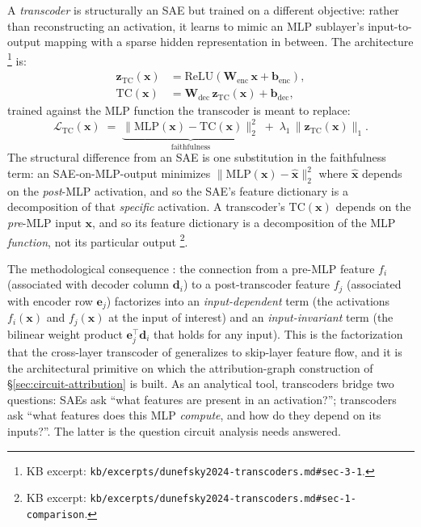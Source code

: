 A \emph{transcoder} \citep{dunefsky2024-transcoders} is structurally an
SAE but trained on a different objective: rather than reconstructing an
activation, it learns to mimic an MLP sublayer's input-to-output
mapping with a sparse hidden representation in between. The
architecture
\citep[\S 3.1, Eq.~3--5]{dunefsky2024-transcoders}\footnote{KB excerpt:
\texttt{kb/excerpts/dunefsky2024-transcoders.md\#sec-3-1}.} is:
\begin{align}
  \mathbf{z}_{\text{TC}}(\mathbf{x})
  &= \mathrm{ReLU}\!\left(\mathbf{W}_{\text{enc}}\,\mathbf{x} + \mathbf{b}_{\text{enc}}\right),
  \label{eq:transcoder-encoder}\\
  \mathrm{TC}(\mathbf{x})
  &= \mathbf{W}_{\text{dec}}\,\mathbf{z}_{\text{TC}}(\mathbf{x}) + \mathbf{b}_{\text{dec}},
  \label{eq:transcoder-decoder}
\end{align}
trained against the MLP function the transcoder is meant to replace:
\begin{equation}
  \mathcal{L}_{\text{TC}}(\mathbf{x})
  \;=\;
  \underbrace{\|\mathrm{MLP}(\mathbf{x}) - \mathrm{TC}(\mathbf{x})\|_2^2}_{\text{faithfulness}}
  \;+\;
  \lambda_1\,\|\mathbf{z}_{\text{TC}}(\mathbf{x})\|_1.
  \label{eq:transcoder-loss}
\end{equation}
The structural difference from an SAE is one substitution in the
faithfulness term: an SAE-on-MLP-output minimizes
$\|\mathrm{MLP}(\mathbf{x}) - \hat{\mathbf{x}}\|_2^2$ where
$\hat{\mathbf{x}}$ depends on the \emph{post}-MLP activation, and so
the SAE's feature dictionary is a decomposition of that
\emph{specific} activation. A transcoder's $\mathrm{TC}(\mathbf{x})$
depends on the \emph{pre}-MLP input $\mathbf{x}$, and so its feature
dictionary is a decomposition of the MLP \emph{function}, not its
particular output \citep[\S 1]{dunefsky2024-transcoders}\footnote{KB
excerpt: \texttt{kb/excerpts/dunefsky2024-transcoders.md\#sec-1-comparison}.}.

The methodological consequence \citep[\S 1]{dunefsky2024-transcoders}:
the connection from a pre-MLP feature $f_i$ (associated with decoder
column $\mathbf{d}_i$) to a post-transcoder feature $f_j$ (associated
with encoder row $\mathbf{e}_j$) factorizes into an
\emph{input-dependent} term (the activations $f_i(\mathbf{x})$ and
$f_j(\mathbf{x})$ at the input of interest) and an \emph{input-invariant}
term (the bilinear weight product
$\mathbf{e}_j^\top\mathbf{d}_i$ that holds for any input). This is the
factorization that the cross-layer transcoder of
\citet{lindsey2025-circuit-tracing} generalizes to skip-layer feature
flow, and it is the architectural primitive on which the
attribution-graph construction of \S\ref{sec:circuit-attribution} is
built. As an analytical tool, transcoders bridge two questions: SAEs
ask ``what features are present in an activation?''; transcoders ask
``what features does this MLP \emph{compute}, and how do they depend
on its inputs?''. The latter is the question circuit analysis needs
answered.

